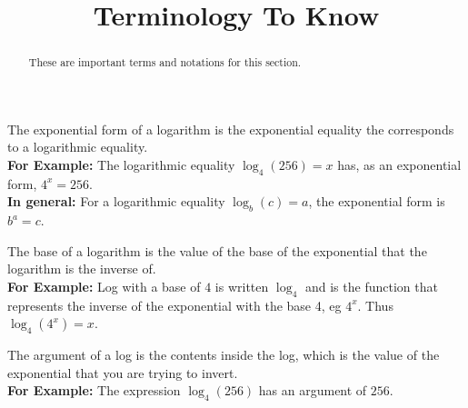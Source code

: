 \documentclass{ximeraXloud}
\title{Terminology To Know}
\begin{document}
\begin{abstract}
    These are important terms and notations for this section.
\end{abstract}
\maketitle


\begin{definition}
    The exponential form of a logarithm is the exponential equality the corresponds to a logarithmic equality.\\
    \textbf{For Example:} The logarithmic equality $\log_4(256) = x$ has, as an exponential form, $4^x = 256$.\\
    \textbf{In general:} For a logarithmic equality $\log_b(c) = a$, the exponential form is $b^a = c$.
\end{definition} 

\begin{definition}
    The base of a logarithm is the value of the base of the exponential that the logarithm is the inverse of.\\
    \textbf{For Example:} Log with a base of $4$ is written $\log_4$ and is the function that represents the inverse of the exponential with the base 4, eg $4^x$. Thus $\log_4(4^x) = x$.
\end{definition} 

\begin{definition}
    The argument of a log is the contents inside the log, which is the value of the exponential that you are trying to invert.\\
    \textbf{For Example:} The expression $\log_4(256)$ has an argument of $256$.
\end{definition}
\end{document}
